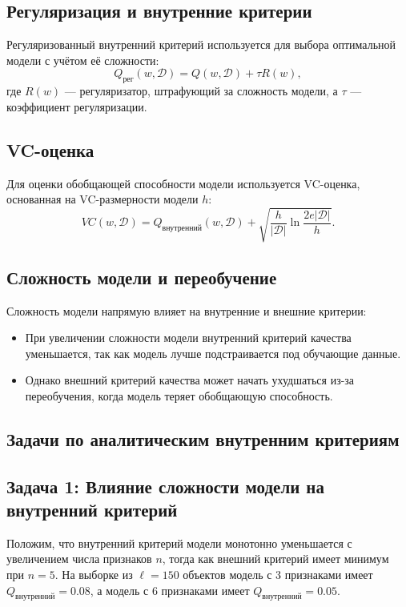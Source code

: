 \subsection*{Регуляризация и внутренние критерии}
Регуляризованный внутренний критерий используется для выбора оптимальной модели с учётом её сложности:
\[
Q_{\text{рег}}(w, \mathcal{D}) = Q(w, \mathcal{D}) + \tau R(w),
\]
где $R(w)$ --- регуляризатор, штрафующий за сложность модели, а $\tau$ --- коэффициент регуляризации.

\subsection*{VC-оценка}
Для оценки обобщающей способности модели используется VC-оценка, основанная на VC-размерности модели $h$:
\[
VC(w, \mathcal{D}) = Q_{\text{внутренний}}(w, \mathcal{D}) + \sqrt{\frac{h}{|\mathcal{D}|} \ln \frac{2e|\mathcal{D}|}{h}}.
\]

\subsection*{Сложность модели и переобучение}
Сложность модели напрямую влияет на внутренние и внешние критерии:
\begin{itemize}
    \item При увеличении сложности модели внутренний критерий качества уменьшается, так как модель лучше подстраивается под обучающие данные.
    \item Однако внешний критерий качества может начать ухудшаться из-за переобучения, когда модель теряет обобщающую способность.
\end{itemize}


\subsection*{Задачи по аналитическим внутренним критериям}

\subsection*{Задача 1: Влияние сложности модели на внутренний критерий}

Положим, что внутренний критерий модели монотонно уменьшается с увеличением числа признаков $n$, тогда как внешний критерий имеет минимум при $n = 5$. На выборке из $\ell = 150$ объектов модель с 3 признаками имеет $Q_{\text{внутренний}} = 0.08$, а модель с 6 признаками имеет $Q_{\text{внутренний}} = 0.05$. 

